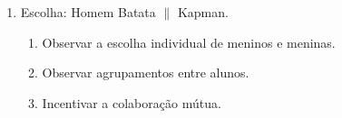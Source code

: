 \begin{enumerate}
	\item Escolha: Homem Batata $\|$ Kapman.
	\begin{enumerate}
		\item Observar a escolha individual de meninos e meninas.
		\item Observar agrupamentos entre alunos.
		\item Incentivar a colaboração mútua.
	\end{enumerate}
\end{enumerate}
